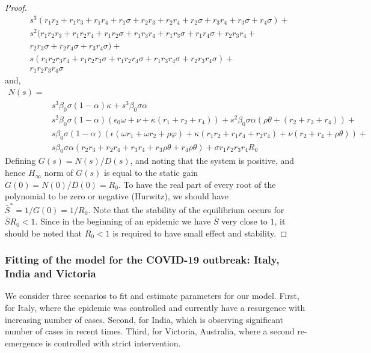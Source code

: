 \documentclass[10pt]{wlscirep}
\begin{document}
\begin{proof}
\begin{equation}
\begin{split}
& s^{3} \left(r_{1} r_{2} + r_{1} r_{3} + r_{1} r_{4} + r_{1} \sigma + r_{2} r_{3} + r_{2} r_{4} + r_{2} \sigma + r_{3} r_{4} + r_{3} \sigma + r_{4} \sigma\right) + \\
& s^{2} (r_{1} r_{2} r_{3} + r_{1} r_{2} r_{4} + r_{1} r_{2} \sigma + r_{1} r_{3} r_{4} + r_{1} r_{3} \sigma + r_{1} r_{4} \sigma + r_{2} r_{3} r_{4} +\\
& r_{2} r_{3} \sigma + r_{2} r_{4} \sigma + r_{3} r_{4} \sigma) + \\ 
& s \left(r_{1} r_{2} r_{3} r_{4} + r_{1} r_{2} r_{3} \sigma + r_{1} r_{2} r_{4} \sigma + r_{1} r_{3} r_{4} \sigma + r_{2} r_{3} r_{4} \sigma\right) +\\ 
& r_{1} r_{2} r_{3} r_{4} \sigma 
\end{split}
\nonumber
\end{equation}
%
and,
\begin{equation}
\begin{split}
N(s) = \\
& s^{3} \beta_0 \sigma \left( 1-  \alpha\right) \kappa + s^{3} \beta_0 \sigma \alpha \\
& s^{2} \beta_0 \sigma \left( 1-\alpha\right)\left( \epsilon_0 \omega + \nu + \kappa \left( r_1+r_2+r_4\right) \right) + s^{2} \beta_0 \sigma \alpha \left( \rho \theta + \left( r_2+r_3+r_4\right) \right) + \\
& s \beta_0 \sigma (1-\alpha) (\epsilon ( \omega r_1+  \omega r_2 + \rho \varphi ) + \kappa (r_1r_2+r_1r_4+r_2r_4) + \nu (r_2+r_4+\rho \theta)) + \\
& s \beta_0 \sigma \alpha (r_2r_3+r_2r_4+r_3r_4+r_3 \rho \theta + r_4 \rho \theta) + \sigma r_1 r_2 r_3 r_4 R_0
\end{split}
\nonumber
\end{equation}
%
%
Defining $G(s) = N(s)/D(s)$, and noting that the system is positive, and hence $H_{\infty}$ norm of $G(s)$ is equal to the static gain $G(0) = N(0)/D(0) = R_0$. To have the real part of every root of the polynomial to be zero or negative (Hurwitz), we should have $\bar{S}^* = {1}/{G(0)} = {1}/{R_0}$. Note that the stability of the equilibrium occurs for $\bar{S}R_0 < 1$. Since in the beginning of an epidemic we have $\bar{S}$ very close to $1$, it should be noted that $R_0 < 1$ is required to have  small effect and stability.
\end{proof}
%
%
\subsubsection*{Fitting of the model for the COVID-19 outbreak: Italy, India and Victoria}
We consider three scenarios to fit and estimate parameters for our model. First, for Italy, where the epidemic was controlled and currently have a resurgence with increasing number of cases. Second, for India, which is observing significant number of cases in recent times. Third, for Victoria, Australia, where a second re-emergence is controlled with strict intervention.
\end{document}
